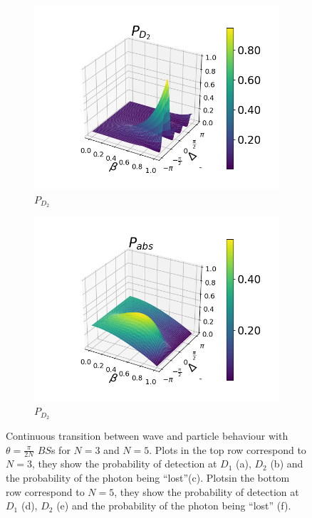 \documentclass[12pt]{book}
\begin{document}
\begin{figure}[H]
\begin{subfigure}[b]{0.3\linewidth}
\includegraphics[width=\linewidth]{images/pd2_5.png}
\caption{$P_{D_{2}}$ }
\label{fig:BS1}
\end{subfigure}
\begin{subfigure}[b]{0.3\linewidth}
\includegraphics[width=\linewidth]{images/pabs_5.png}
\caption{$P_{D_{2}}$ }
\label{fig:BS1}
\end{subfigure}
\caption{Continuous transition between wave and particle behaviour with $\theta=\frac{\pi}{2N}$ $BS$s for $N=3$ and $N=5$. Plots in the top row correspond to $N=3$, they show the probability of detection at $D_{1}$ (a), $D_{2}$ (b) and the probability of the photon being ``lost''(c). Plotsin the bottom row correspond to $N=5$, they show the probability of detection at $D_{1}$ (d),  $D_{2}$ (e) and the probability of the photon being ``lost'' (f).}
\label{figvarias2}
\end{figure}
\end{document}
